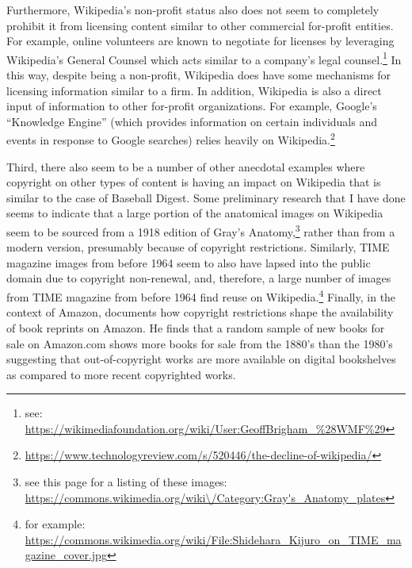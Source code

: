 \documentclass[11pt]{article}
\begin{document}
Furthermore, Wikipedia's non-profit status also does not seem to completely prohibit it from licensing content similar to other commercial for-profit entities. For example, online volunteers are known to negotiate for licenses by leveraging Wikipedia's General Counsel which acts similar to a company's legal counsel.\footnote{see: \url{https://wikimediafoundation.org/wiki/User:GeoffBrigham_\%28WMF\%29}} In this way, despite being a non-profit, Wikipedia does have some mechanisms for licensing information similar to a firm. In addition, Wikipedia is also a direct input of information to other for-profit organizations. For example, Google's ``Knowledge Engine'' (which provides information on certain individuals and events in response to Google searches) relies heavily on Wikipedia.\footnote{\url{https://www.technologyreview.com/s/520446/the-decline-of-wikipedia/}}

Third, there also seem to be a number of other anecdotal examples where copyright on other types of content is having an impact on Wikipedia that is similar to the case of Baseball Digest. Some preliminary research that I have done seems to indicate that a large portion of the anatomical images on Wikipedia seem to be sourced from a 1918 edition of Gray's Anatomy,\footnote{see this page for a listing of these images: \url{https://commons.wikimedia.org/wiki\/Category:Gray's_Anatomy_plates}} rather than from a modern version, presumably because of copyright restrictions. Similarly, TIME magazine images from before 1964 seem to also have lapsed into the public domain due to copyright non-renewal, and, therefore, a large number of images from TIME magazine from before 1964 find reuse on Wikipedia.\footnote{for example: \url{https://commons.wikimedia.org/wiki/File:Shidehara_Kijuro_on_TIME_magazine_cover.jpg}} Finally, in the context of Amazon, \cite{heald_how_2013} documents how copyright restrictions shape the availability of book reprints on Amazon. He finds that a random sample of new books for sale on Amazon.com shows more books for sale from the 1880's than the 1980's suggesting that out-of-copyright works are more available on digital bookshelves as compared to more recent copyrighted works.
\end{document}
